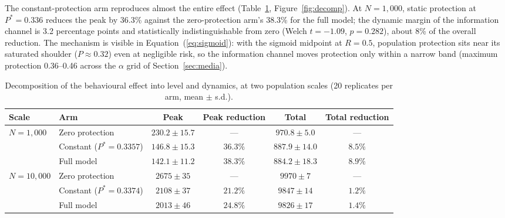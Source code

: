 \documentclass[]{interact}
\begin{document}
The constant-protection arm reproduces almost the entire effect (Table~\ref{tab:decomp}, Figure~\ref{fig:decomp}). At $N{=}1{,}000$, static protection at $P^{*}{=}0.336$ reduces the peak by 36.3\% against the zero-protection arm's 38.3\% for the full model; the dynamic margin of the information channel is 3.2 percentage points and statistically indistinguishable from zero (Welch $t{=}-1.09$, $p{=}0.282$), about 8\% of the overall reduction. The mechanism is visible in Equation~(\ref{eq:sigmoid}): with the sigmoid midpoint at $R{=}0.5$, population protection sits near its saturated shoulder ($P\approx0.32$) even at negligible risk, so the information channel moves protection only within a narrow band (maximum protection 0.36--0.46 across the $\alpha$ grid of Section~\ref{sec:media}).

\begin{table}[htb]
\centering
\small
\begin{tabular}{llcccc}
\hline
\textbf{Scale} & \textbf{Arm} & \textbf{Peak} & \textbf{Peak reduction} & \textbf{Total} & \textbf{Total reduction} \\
\hline
$N{=}1{,}000$ & Zero protection & $230.2 \pm 15.7$ & --- & $970.8 \pm 5.0$ & --- \\
 & Constant ($P^{*}{=}0.3357$) & $146.8 \pm 15.3$ & $36.3\%$ & $887.9 \pm 14.0$ & $8.5\%$ \\
 & Full model & $142.1 \pm 11.2$ & $38.3\%$ & $884.2 \pm 18.3$ & $8.9\%$ \\
\addlinespace
$N{=}10{,}000$ & Zero protection & $2675 \pm 35$ & --- & $9970 \pm 7$ & --- \\
 & Constant ($P^{*}{=}0.3374$) & $2108 \pm 37$ & $21.2\%$ & $9847 \pm 14$ & $1.2\%$ \\
 & Full model & $2013 \pm 46$ & $24.8\%$ & $9826 \pm 17$ & $1.4\%$ \\
\hline
\end{tabular}
\caption{Decomposition of the behavioural effect into level and dynamics, at two population scales (20 replicates per arm, mean $\pm$ s.d.).}
\label{tab:decomp}
\end{table}
\end{document}
